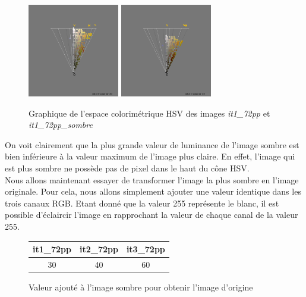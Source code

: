 \documentclass[a4paper,10pt]{article}
\begin{document}
\begin{figure}[!h]
 \begin{center}
 \includegraphics[width=4cm]{resultat/luminance1.png}
 \includegraphics[width=4cm]{resultat/luminance2.png}
 \caption{Graphique de l'espace colorimétrique HSV des images \textit{it1\_72pp} et \textit{it1\_72pp\_sombre}}
 \end{center}
\end{figure}

On voit clairement que la plus grande valeur de luminance de l'image sombre est bien inférieure
à la valeur maximum de l'image plus claire. En effet, l'image qui est plus sombre ne possède pas de pixel dans le haut du cône HSV.\\

Nous allons maintenant essayer de transformer l'image la plus sombre en l'image originale. Pour cela,
nous allons simplement ajouter une valeur identique dans les trois canaux RGB. Etant donné que la valeur 255
représente le blanc, il est possible d'éclaircir l'image en rapprochant la valeur de chaque canal de la valeur 255.

\begin{figure}[!h]
	\begin{center}
	\begin{tabular}{|c|c|c|}
 		\hline
 		it1\_72pp & it2\_72pp & it3\_72pp\\
 		\hline
 		30 & 40 & 60\\
 		\hline
	\end{tabular}
	\caption{Valeur ajouté à l'image sombre pour obtenir l'image d'origine}
	\end{center}
\end{figure}
\end{document}
